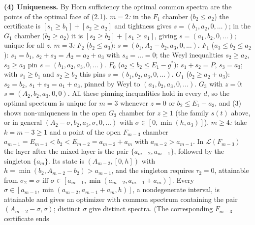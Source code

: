 \documentclass[
  11pt,
  a4paper,
]{article}
\begin{document}
\textbf{(4) Uniqueness.} By Horn sufficiency the optimal common spectra
are the points of the optimal face of (2.1). \emph{\(m=2\):} in the
\(F_1\) chamber (\(b_2\le a_2\)) the certificate is
\([s_1\ge b_1]+[s_2\ge a_2]\) and tightness gives
\(s=(b_1,\allowbreak{}a_2,\allowbreak{}0,\allowbreak{}\dots)\); in the \(G_1\) chamber (\(b_2\ge a_2\)) it is
\([s_2\ge b_2]+[s_1\ge a_1]\), giving \(s=(a_1,\allowbreak{}b_2,\allowbreak{}0,\allowbreak{}\dots)\); unique
for all \(z\). \emph{\(m=3\):} \(F_2\) (\(b_2\le a_3\)):
\(s=(b_1,\allowbreak{}A_2-b_2,\allowbreak{}a_3,\allowbreak{}0,\allowbreak{}\dots)\). \(F_1\) (\(a_3\le b_2\le a_2\)):
\(s_1=b_1\), \(s_2+s_3=A_2=a_2+a_3\) with \(s_4=\dots=0\); the Weyl
inequalities \(s_2\ge a_2\), \(s_3\ge a_3\) pin
\(s=(b_1,\allowbreak{}a_2,\allowbreak{}a_3,\allowbreak{}0,\allowbreak{}\dots)\). \(F_0\) (\(a_2\le b_2\le E_1-g^*\)):
\(s_1+s_2=P\), \(s_3=a_3\); with \(s_1\ge b_1\) and \(s_2\ge b_2\) this
pins \(s=(b_1,\allowbreak{}b_2,\allowbreak{}a_3,\allowbreak{}0,\allowbreak{}\dots)\). \(G_1\) (\(b_2\ge a_2+a_3\)):
\(s_2=b_2\), \(s_1+s_3=a_1+a_3\), pinned by Weyl to
\((a_1,\allowbreak{}b_2,\allowbreak{}a_3,\allowbreak{}0,\allowbreak{}\dots)\). \(G_3\) with \(z=0\):
\(s=(A_2,\allowbreak{}b_2,\allowbreak{}a_3,\allowbreak{}0,\allowbreak{}0)\). All these pinning inequalities hold in every
\(d\), so the optimal spectrum is unique for \(m=3\) whenever \(z=0\) or
\(b_2\le E_1-a_3\), and (3) shows non-uniqueness in the open \(G_3\)
chamber for \(z\ge1\) (the family \(s(t)\) above, or in general
\((A_2-\sigma,\allowbreak{}b_2,\allowbreak{}a_3,\allowbreak{}\sigma,\allowbreak{}0,\allowbreak{}\dots)\) with
\(\sigma\in[0,\allowbreak{}\min(h,\allowbreak{}a_3)]\)). \emph{\(m\ge4\):} take \(k=m-3\ge1\) and
a point of the open \(F_{m-3}\) chamber
\(a_{m-1}=E_{m-1}<b_2<E_{m-2}=a_{m-2}+a_m\) with \(a_{m-2}>a_{m-1}\). In
\(\mathcal L(F_{m-3})\) the layer after the mixed layer is the pair
\(\{a_{m-2},\allowbreak{}a_{m-1}\}\), followed by the singleton \(\{a_m\}\). Its
state is \((A_{m-2},\allowbreak{}[0,\allowbreak{}h])\) with \(h=\min(b_2,\allowbreak{}A_{m-2}-b_2)>a_{m-1}\),
and the singleton requires \(\tau_2=0\), attainable from
\(\sigma_2=\sigma\) iff
\(\sigma\in[a_{m-1},\allowbreak{}\min(a_{m-2},\allowbreak{}a_{m-1}+a_m)]\). Every
\(\sigma\in[a_{m-1},\allowbreak{}\min(a_{m-2},\allowbreak{}a_{m-1}+a_m,\allowbreak{}h)]\), a nondegenerate
interval, is attainable and gives an optimizer with common spectrum
containing the pair \((A_{m-2}-\sigma,\allowbreak{}\sigma)\); distinct \(\sigma\)
give distinct spectra. (The corresponding \(F_{m-3}\) certificate ends
\end{document}

